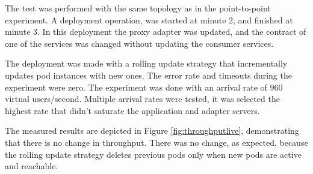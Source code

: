 The test was performed with the same topology as in the point-to-point experiment.
A deployment operation, was started at minute 2, and finished at minute 3.
In this deployment the proxy adapter was updated, and the contract of one of the services was changed without updating the consumer services.

The deployment was made with a rolling update strategy that incrementally updates pod instances with new ones.
The error rate and timeouts during the experiment were zero.
The experiment was done with an arrival rate of 960 virtual users/second.
Multiple arrival rates were tested, it was selected the highest rate that didn't saturate the application and adapter servers.

The measured results are depicted in Figure \ref{fig:throughputlive}, demonstrating that there is no change in throughput.
There was no change, as expected, because the rolling update strategy deletes previous pods only when new pods are active and reachable.